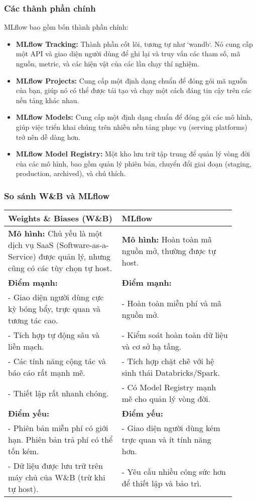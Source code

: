 \subsubsection{Các thành phần chính}
MLflow bao gồm bốn thành phần chính:
\begin{itemize}
    \item \textbf{MLflow Tracking:} Thành phần cốt lõi, tương tự như `wandb`. Nó cung cấp một API và giao diện người dùng để ghi lại và truy vấn các tham số, mã nguồn, metric, và các hiện vật của các lần chạy thí nghiệm.
    \item \textbf{MLflow Projects:} Cung cấp một định dạng chuẩn để đóng gói mã nguồn của bạn, giúp nó có thể được tái tạo và chạy một cách đáng tin cậy trên các nền tảng khác nhau.
    \item \textbf{MLflow Models:} Cung cấp một định dạng chuẩn để đóng gói các mô hình, giúp việc triển khai chúng trên nhiều nền tảng phục vụ (serving platforms) trở nên dễ dàng hơn.
    \item \textbf{MLflow Model Registry:} Một kho lưu trữ tập trung để quản lý vòng đời của các mô hình, bao gồm quản lý phiên bản, chuyển đổi giai đoạn (staging, production, archived), và chú thích.
\end{itemize}

\subsubsection{So sánh W\&B và MLflow}
\begin{tcolorbox}[
    title=Weights \& Biases vs. MLflow,
    colback=blue!5!white, colframe=blue!75!black, fonttitle=\bfseries
]
\begin{tabular}{p{0.45\linewidth} | p{0.45\linewidth}}
    \textbf{Weights \& Biases (W\&B)} & \textbf{MLflow} \\
    \hline
    \textbf{Mô hình:} Chủ yếu là một dịch vụ SaaS (Software-as-a-Service) được quản lý, nhưng cũng có các tùy chọn tự host. & \textbf{Mô hình:} Hoàn toàn mã nguồn mở, thường được tự host. \\
    \hline
    \textbf{Điểm mạnh:} & \textbf{Điểm mạnh:} \\
    - Giao diện người dùng cực kỳ bóng bẩy, trực quan và tương tác cao. & - Hoàn toàn miễn phí và mã nguồn mở. \\
    - Tích hợp tự động sâu và liền mạch. & - Kiểm soát hoàn toàn dữ liệu và cơ sở hạ tầng. \\
    - Các tính năng cộng tác và báo cáo rất mạnh mẽ. & - Tích hợp chặt chẽ với hệ sinh thái Databricks/Spark. \\
    - Thiết lập rất nhanh chóng. & - Có Model Registry mạnh mẽ cho quản lý vòng đời. \\
    \hline
    \textbf{Điểm yếu:} & \textbf{Điểm yếu:} \\
    - Phiên bản miễn phí có giới hạn. Phiên bản trả phí có thể tốn kém. & - Giao diện người dùng kém trực quan và ít tính năng hơn. \\
    - Dữ liệu được lưu trữ trên máy chủ của W\&B (trừ khi tự host). & - Yêu cầu nhiều công sức hơn để thiết lập và bảo trì. \\
\end{tabular}
\end{tcolorbox}

